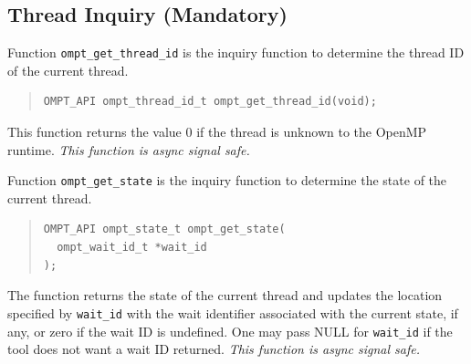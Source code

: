 \documentclass{article}
\begin{document}
\subsection{Thread Inquiry (Mandatory)}
\label{sec:thread-inquiry}

Function \verb|ompt_get_thread_id| is the inquiry function to determine the thread ID of the 
current thread.

\begin{quote}
\begin{verbatim}
OMPT_API ompt_thread_id_t ompt_get_thread_id(void);
\end{verbatim}
\end{quote}
 
 \noindent
This function returns the value 0 if the thread is unknown to the OpenMP runtime.  {\em This function is async signal safe.}
 
Function \verb|ompt_get_state| is the inquiry function to determine the state of the 
current thread.

\begin{quote}
\begin{verbatim}
OMPT_API ompt_state_t ompt_get_state(
  ompt_wait_id_t *wait_id       
);
\end{verbatim}
\end{quote}
 
\noindent
The function returns the state of the current thread and updates
 the location specified by \verb|wait_id| with the wait
 identifier associated with the current state, if any, or zero if the wait ID is undefined.
One may pass NULL for \verb|wait_id| if the tool does not want a wait ID returned.
 {\em This function is async signal safe.}
 

\end{document}
